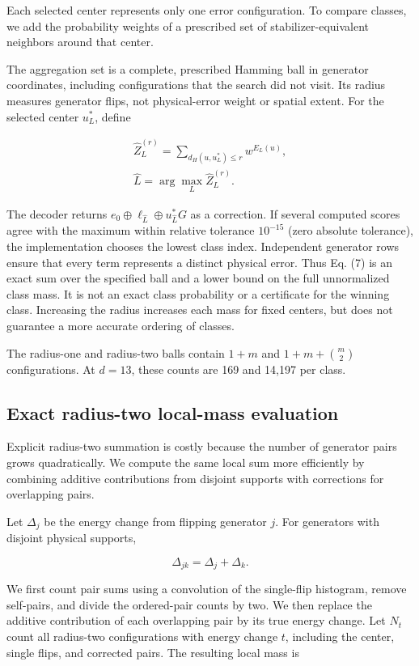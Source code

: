 \documentclass[aps,prapplied,reprint,superscriptaddress,amsmath,amssymb,floatfix,nofootinbib]{revtex4-2}
\begin{document}
Each selected center represents only one error configuration. To compare
classes, we add the probability weights of a prescribed set of
stabilizer-equivalent neighbors around that center.

The aggregation set is a complete, prescribed Hamming ball in generator
coordinates, including configurations that the search did not visit. Its
radius measures generator flips, not physical-error weight or spatial
extent. For the selected center \(u_L^*\), define

\[
\begin{gathered}
\widehat Z_L^{(r)}=
\sum_{d_H(u,u_L^*)\le r} w^{E_L(u)},
\\ \widehat L=\arg\max_L\widehat Z_L^{(r)}.
\end{gathered}
\tag{7}\label{eq:7}
\]

The decoder returns
\(e_0\oplus\ell_{\widehat L}\oplus u_{\widehat L}^*G\) as a correction.
If several computed scores agree with the maximum within relative
tolerance \(10^{-15}\) (zero absolute tolerance), the implementation
chooses the lowest class index. Independent generator rows ensure that
every term represents a distinct physical error. Thus Eq. (7) is an
exact sum over the specified ball and a lower bound on the full
unnormalized class mass. It is not an exact class probability or a
certificate for the winning class. Increasing the radius increases each
mass for fixed centers, but does not guarantee a more accurate ordering
of classes.

The radius-one and radius-two balls contain \(1+m\) and
\(1+m+\binom m2\) configurations. At \(d=13\), these counts are 169 and
14,197 per class.

\subsection{Exact radius-two local-mass
evaluation}\label{e.-exact-radius-two-local-mass-evaluation}

Explicit radius-two summation is costly because the number of generator
pairs grows quadratically. We compute the same local sum more
efficiently by combining additive contributions from disjoint supports
with corrections for overlapping pairs.

Let \(\Delta_j\) be the energy change from flipping generator \(j\). For
generators with disjoint physical supports,

\[
\Delta_{jk}=\Delta_j+\Delta_k.
\tag{8}\label{eq:8}
\]

We first count pair sums using a convolution of the single-flip
histogram, remove self-pairs, and divide the ordered-pair counts by two.
We then replace the additive contribution of each overlapping pair by
its true energy change. Let \(N_t\) count all radius-two configurations
with energy change \(t\), including the center, single flips, and
corrected pairs. The resulting local mass is
\end{document}
